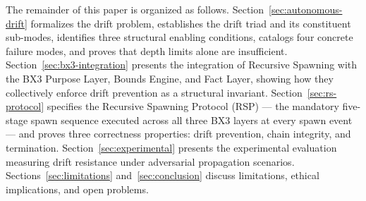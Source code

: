 The remainder of this paper is organized as follows. Section~\ref{sec:autonomous-drift} formalizes the drift problem, establishes the drift triad and its constituent sub-modes, identifies three structural enabling conditions, catalogs four concrete failure modes, and proves that depth limits alone are insufficient. Section~\ref{sec:bx3-integration} presents the integration of Recursive Spawning with the BX3 Purpose Layer, Bounds Engine, and Fact Layer, showing how they collectively enforce drift prevention as a structural invariant. Section~\ref{sec:rs-protocol} specifies the Recursive Spawning Protocol (RSP) — the mandatory five-stage spawn sequence executed across all three BX3 layers at every spawn event — and proves three correctness properties: drift prevention, chain integrity, and termination. Section~\ref{sec:experimental} presents the experimental evaluation measuring drift resistance under adversarial propagation scenarios. Sections~\ref{sec:limitations} and~\ref{sec:conclusion} discuss limitations, ethical implications, and open problems.